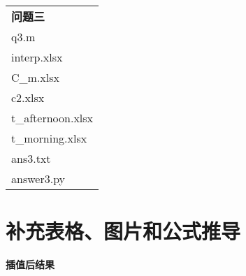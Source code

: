 \documentclass[withoutpreface,bwprint]{cumcmthesis} %
\begin{document}
\begin{appendices}
\begin{table}[!htbp]
\begin{tabular*}{\hsize}{@{}@{\extracolsep{\fill}}l@{}}
		\qquad \qquad \textbf{问题三} \\
		\qquad \qquad \qquad q3.m \\
		\qquad \qquad \qquad interp.xlsx \\
		\qquad \qquad \qquad C\_m.xlsx \\
		\qquad \qquad \qquad c2.xlsx \\
		\qquad \qquad \qquad t\_afternoon.xlsx \\
		\qquad \qquad \qquad t\_morning.xlsx \\
		\qquad \qquad \qquad ans3.txt \\
		\qquad \qquad \qquad answer3.py \\
		\bottomrule[1.5pt]
	\end{tabular*}
\end{table}





\newpage



\section{补充表格、图片和公式推导}

\textbf{插值后结果}


\end{appendices}
\end{document}
